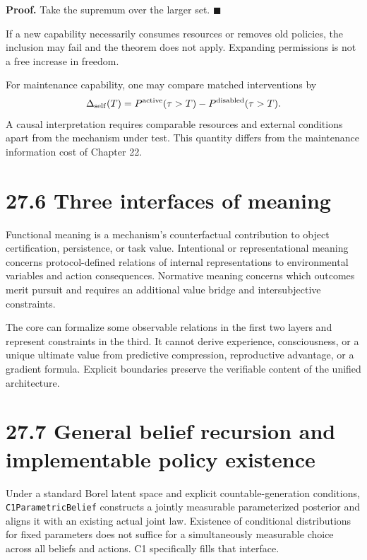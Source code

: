 \documentclass[
  english,
  11pt,
  oneside]{book}
\begin{document}
\textbf{Proof.} Take the supremum over the larger set. \(\blacksquare\)

If a new capability necessarily consumes resources or removes old policies, the inclusion may fail and the theorem does not apply. Expanding permissions is not a free increase in freedom.

For maintenance capability, one may compare matched interventions by \[\Delta_{\rm self}(T)
=P^{\rm active}(\tau>T)-P^{\rm disabled}(\tau>T).\] A causal interpretation requires comparable resources and external conditions apart from the mechanism under test. This quantity differs from the maintenance information cost of Chapter 22.

\section{27.6 Three interfaces of meaning}\label{three-interfaces-of-meaning}

Functional meaning is a mechanism's counterfactual contribution to object certification, persistence, or task value. Intentional or representational meaning concerns protocol-defined relations of internal representations to environmental variables and action consequences. Normative meaning concerns which outcomes merit pursuit and requires an additional value bridge and intersubjective constraints.

The core can formalize some observable relations in the first two layers and represent constraints in the third. It cannot derive experience, consciousness, or a unique ultimate value from predictive compression, reproductive advantage, or a gradient formula. Explicit boundaries preserve the verifiable content of the unified architecture.

\section{27.7 General belief recursion and implementable policy existence}\label{general-belief-recursion-and-implementable-policy-existence}

Under a standard Borel latent space and explicit countable-generation conditions, \nolinkurl{C1ParametricBelief} constructs a jointly measurable parameterized posterior and aligns it with an existing actual joint law. Existence of conditional distributions for fixed parameters does not suffice for a simultaneously measurable choice across all beliefs and actions. C1 specifically fills that interface.
\end{document}
